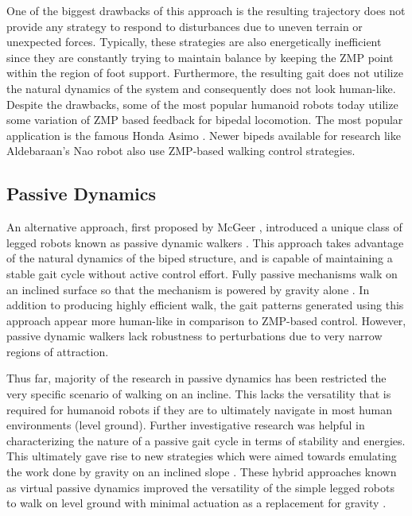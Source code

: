 One of the biggest drawbacks of this approach is the resulting trajectory does not provide any strategy to respond to disturbances due to uneven terrain or unexpected forces. Typically, these strategies \cite{Kajita:1997vr,Kajita:2001fk,Sugihara:2002kq} are also energetically inefficient since they are constantly trying to maintain balance by keeping the ZMP point within the region of foot support. Furthermore, the resulting gait does not utilize the natural dynamics of the system and consequently does not look human-like. Despite the drawbacks, some of the most popular humanoid robots today utilize some variation of ZMP based feedback for bipedal locomotion. The most popular application is the famous Honda Asimo \cite{Hirai1998}. Newer bipeds available for research like Aldebaraan's Nao \cite{Gouaillier2006} robot also use ZMP-based walking control strategies. 


\subsection{Passive Dynamics} %
\label{sub:related_passive_dynamics}
An alternative approach, first proposed by McGeer \cite{McGeer:1990uk}, introduced a unique class of legged robots known as passive dynamic walkers \cite{Collins:2005vp}. This approach takes advantage of the natural dynamics of the biped structure, and is capable of maintaining a stable gait cycle without active control effort. Fully passive mechanisms walk on an inclined surface so that the mechanism is powered by gravity alone \cite{Spong:1999vk}. In addition to producing highly efficient walk, the gait patterns generated using this approach appear more human-like in comparison to ZMP-based control. However, passive dynamic walkers lack robustness to perturbations due to very narrow regions of attraction.

Thus far, majority of the research in passive dynamics has been restricted the very specific scenario of walking on an incline. This lacks the versatility that is required for humanoid robots if they are to ultimately navigate in most human environments (level ground). Further investigative research was helpful in characterizing the nature of a passive gait cycle \cite{Goswami:1996gn} in terms of stability and energies. This ultimately gave rise to new strategies which were aimed towards emulating the work done by gravity on an inclined slope \cite{Asano:2000wi}. These hybrid approaches known as virtual passive dynamics improved the versatility of the simple legged robots to walk on level ground with minimal actuation as a replacement for gravity \cite{Asano:2004tv}. 

